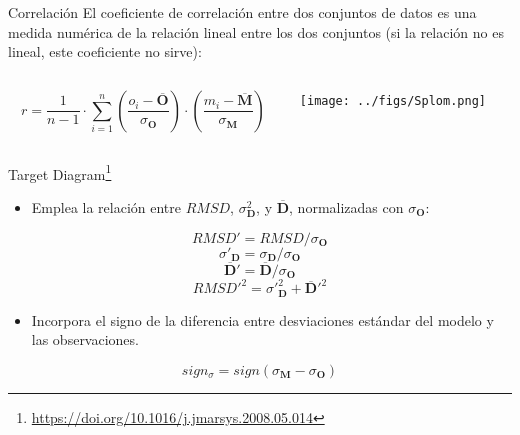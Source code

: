 \documentclass[aspectratio=169, usenames,svgnames,dvipsnames]{beamer}
\begin{document}
\begin{frame}[label={sec:orgebf4c8b}]{Correlación}
El coeficiente de correlación entre dos conjuntos de datos es una
medida numérica de la relación \alert{lineal} entre los dos conjuntos (si la
relación no es lineal, este coeficiente no sirve):

\begin{columns}
\begin{column}{0.5\columnwidth}
\[
r = \frac{1}{n-1} \cdot \sum_{i=1}^{n} \left( \frac{o_{i}-\overline{\mathbf{O}}}{\sigma_{\mathbf{O}}}\right) \cdot \left(\frac{m_{i}-\overline{\mathbf{M}}}{\sigma_{\mathbf{M}}}\right)
\]
\end{column}

\begin{column}{0.5\columnwidth}
\begin{center}
\texttt{[image: ../figs/Splom.png]}
\end{center}
\end{column}
\end{columns}
\end{frame}


\begin{frame}[label={sec:orge00ad08}]{Target Diagram\footnote{\url{https://doi.org/10.1016/j.jmarsys.2008.05.014}}}
\begin{itemize}
\item Emplea la relación entre \(RMSD\), \(\sigma^2_{\mathbf{D}}\), y \(\overline{\mathbf{D}}\), normalizadas con \(\sigma_{\mathbf{O}}\):
\end{itemize}
  \[
  RMSD' = RMSD / \sigma_{\mathbf{O}}
  \]
\[
  \sigma'_{\mathbf{D}} = \sigma_{\mathbf{D}} / \sigma_{\mathbf{O}} 
\]
\[
\overline{\mathbf{D}}' = \overline{\mathbf{D}} / \sigma_{\mathbf{O}}
\]
\[
RMSD'^2= \sigma'^2_{\mathbf{D}} + \overline{\mathbf{D}}'^2
\]

\begin{itemize}
\item Incorpora el signo de la diferencia entre desviaciones estándar del modelo y las observaciones.
\end{itemize}
\[
sign_{\sigma} =  sign(\sigma_{\mathbf{M}} - \sigma_{\mathbf{O}} )
\]


\nocite{Jolliff.Kindle.ea2009}
\end{frame}
\end{document}
